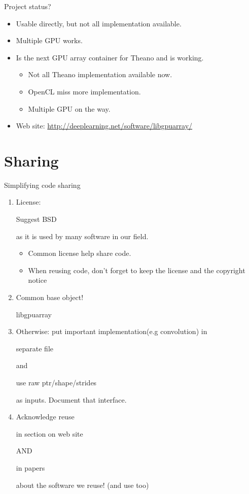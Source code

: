 \documentclass[utf8x,xcolor=pdftex,dvipsnames,table]{beamer}
\begin{document}
\begin{frame}{Project status?}
  \begin{itemize}
  \item Usable directly, but not all implementation available.
  \item Multiple GPU works.
  \item Is the next GPU array container for Theano and is working.
    \begin{itemize}
    \item Not all Theano implementation available now.
    \item OpenCL miss more implementation.
    \item Multiple GPU on the way.
    \end{itemize}
  \item Web site: \url{http://deeplearning.net/software/libgpuarray/}
  \end{itemize}
\end{frame}

\section{Sharing}
\begin{frame}
  \tableofcontents[currentsection]
\end{frame}

\begin{frame}{Simplifying code sharing}
\begin{enumerate}
  \item<1-> License: \begin{bf}Suggest BSD\end{bf} as it is used by many software in our field.
    \begin{itemize}
    \item Common license help share code.
    \item When reusing code, don't forget to keep the license and the copyright notice
    \end{itemize}
  \item<2-> Common base object! \begin{bf}libgpuarray\end{bf}
  \item<3-> Otherwise: put important implementation(e.g convolution) in \begin{bf}separate file\end{bf} and \begin{bf}use raw ptr/shape/strides\end{bf} as inputs. Document that interface.
  \item<4-> Acknowledge reuse \begin{bf}in section on web site\end{bf} AND \begin{bf}in papers\end{bf} about the software we reuse! (and use too)
\end{enumerate}

\end{frame}
\end{document}
